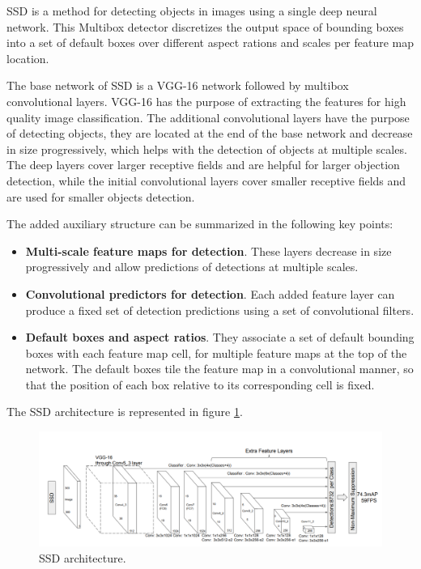     
    \par SSD is a method for detecting objects in images using a single deep neural network. This Multibox detector discretizes the output space of bounding boxes into a set of default boxes over different aspect rations and scales per feature map location.

    \par The base network of SSD is a VGG-16 network \cite{simonyan2014deep} followed by multibox convolutional layers. VGG-16 has the purpose of extracting the features for high quality image classification. The additional convolutional layers have the purpose of detecting objects, they are located at the end of the base network and decrease in size progressively, which helps with the detection of objects at multiple scales. The deep layers cover larger receptive fields and are helpful for larger objection detection, while the initial convolutional layers cover smaller receptive fields and are used for smaller objects detection. \cite{Liu2016}
    \par The added auxiliary structure can be summarized in the following key points:

    \begin{itemize}
        \item \textbf{Multi-scale feature maps for detection}. These layers decrease in size progressively and allow predictions of detections at multiple scales.
        \item \textbf{Convolutional predictors for detection}. Each added feature layer can produce a fixed set of detection predictions using a set of convolutional 
        filters.
        \item \textbf{Default boxes and aspect ratios}. They associate a set of default bounding boxes with each feature map cell, for multiple feature maps at the top of the network. The default boxes tile the feature map in a convolutional manner, so that the position of each box relative to its corresponding cell is fixed.
    \end{itemize}

    
    \par The SSD architecture is represented in figure \ref{fig:ssd}.

    \begin{figure}[htb]
        \centering
        \includegraphics[scale = 0.35]{Sections/2StateOfTheArt/2_images/ssd_arch.png}
        \caption{SSD architecture. \cite{Liu2016}} 
        \label{fig:ssd}
    \end{figure}



